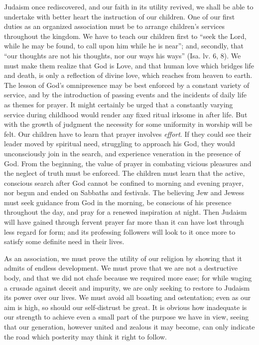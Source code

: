 Judaism once rediscovered, and our faith in its utility 
revived, we shall be able to undertake with better heart 
the instruction of our children. One of our first duties 
as an organized association must be to arrange children's 
services throughout the kingdom. We have to teach our 
children first to ``seek the Lord, while he may be found, 
to call upon him while he is near''; and, secondly, that 
``our thoughts are not his thoughts, nor our ways his 
ways'' (Isa. lv. 6, 8). We must make them realize that 
God is Love, and that human love which bridges life and 
death, is only a reflection of divine love, which reaches 
from heaven to earth. The lesson of God's omnipresence 
may be best enforced by a constant variety of service, and 
by the introduction of passing events and the incidents of 
daily life as themes for prayer. It might certainly be 
urged that a constantly varying service during childhood 
would render any fixed ritual irksome in after life. But 
with the growth of judgment the necessity for some uniformity in worship will be felt. Our children have to 
learn that prayer involves \textsl{effort}. If they could see their 
leader moved by spiritual need, struggling to approach his 
God, they would unconsciously join in the search, and 
experience veneration in the presence of God. From the 
beginning, the value of prayer in combating vicious 
pleasures and the neglect of truth must be enforced. The 
children must learn that the active, conscious search after 
God cannot be confined to morning and evening prayer, 
nor begun and ended on Sabbaths and festivals. The 
believing Jew and Jewess must seek guidance from God in 
the morning, be conscious of his presence throughout the 
day, and pray for a renewed inspiration at night. Then 
Judaism will have gained through fervent prayer far more 
than it can have lost through less regard for form; and its 
professing followers will look to it once more to satisfy 
some definite need in their lives. 

As an association, we must prove the utility of our 
religion by showing that it admits of endless development. 
We must prove that we are not a destructive body, and 
that we did not chafe because we required more ease; for 
while waging a crusade against deceit and impurity, we 
are only seeking to restore to Judaism its power over 
our lives. We must avoid all boasting and ostentation; 
even as our aim is high, so should our self-distrust be 
great. It is obvious how inadequate is our strength to 
achieve even a small part of the purpose we have in view, 
seeing that our generation, however united and zealous it 
may become, can only indicate the road which posterity 
may think it right to follow. 

